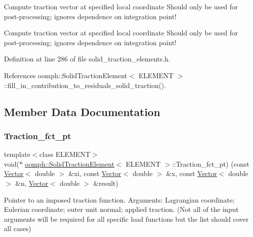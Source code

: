 Compute traction vector at specified local coordinate Should only be used for post-\/processing; ignores dependence on integration point! 

Compute traction vector at specified local coordinate Should only be used for post-\/processing; ignores dependence on integration point! 

Definition at line 286 of file solid\+\_\+traction\+\_\+elements.\+h.



References oomph\+::\+Solid\+Traction\+Element$<$ E\+L\+E\+M\+E\+N\+T $>$\+::fill\+\_\+in\+\_\+contribution\+\_\+to\+\_\+residuals\+\_\+solid\+\_\+traction().



\subsection{Member Data Documentation}
\mbox{\label{classoomph_1_1SolidTractionElement_af66418f6a001f5bc7e7dce7b67ae575e}} 
\subsubsection{\texorpdfstring{Traction\+\_\+fct\+\_\+pt}{Traction\_fct\_pt}}
{\footnotesize\ttfamily template$<$class E\+L\+E\+M\+E\+NT$>$ \\
void($\ast$ \hyperlink{classoomph_1_1SolidTractionElement}{oomph\+::\+Solid\+Traction\+Element}$<$ E\+L\+E\+M\+E\+NT $>$\+::Traction\+\_\+fct\+\_\+pt) (const \hyperlink{classoomph_1_1Vector}{Vector}$<$ double $>$ \&xi, const \hyperlink{classoomph_1_1Vector}{Vector}$<$ double $>$ \&x, const \hyperlink{classoomph_1_1Vector}{Vector}$<$ double $>$ \&n, \hyperlink{classoomph_1_1Vector}{Vector}$<$ double $>$ \&result)\hspace{0.3cm}{\ttfamily [protected]}}



Pointer to an imposed traction function. Arguments\+: Lagrangian coordinate; Eulerian coordinate; outer unit normal; applied traction. (Not all of the input arguments will be required for all specific load functions but the list should cover all cases) 



